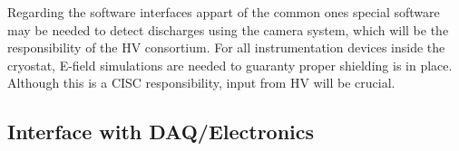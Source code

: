 Regarding the software interfaces appart of the common ones special software may be needed to detect discharges
using the camera system, which will be the responsibility of the HV consortium. For all instrumentation devices inside the cryostat,
E-field simulations are needed to guaranty proper shielding is in place. Although this is a CISC responsibility, input from HV will be crucial.

\subsection{Interface with DAQ/Electronics}
\label{sec:fdsp-slow-cryo-slow-daq}














